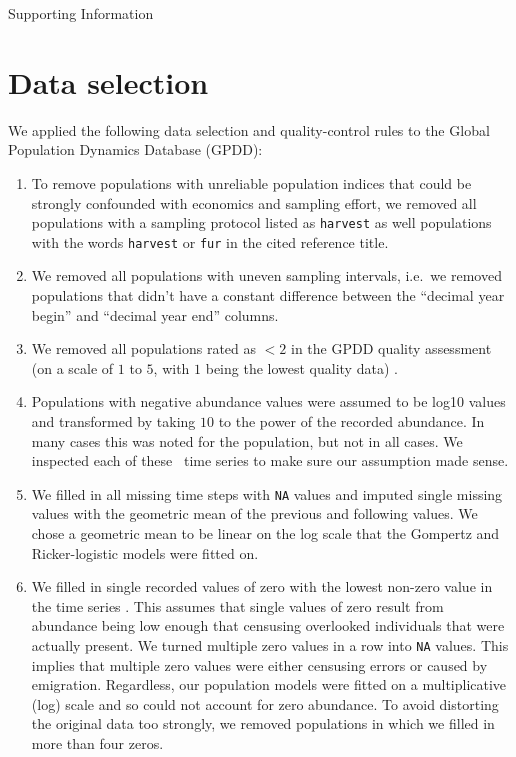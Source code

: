
\begin{centering}
\LARGE
Supporting Information\\[1.0em]
\end{centering}

\section{Data selection}

We applied the following data selection and quality-control rules to the Global Population Dynamics Database (GPDD):

\begin{enumerate}

\item To remove populations with unreliable population indices that could be strongly confounded with economics and sampling effort, we removed all populations with a sampling protocol listed as \texttt{harvest} as well populations with the words \texttt{harvest} or \texttt{fur} in the cited reference title.

\item We removed all populations with uneven sampling intervals, i.e.\ we removed populations that didn't have a constant difference between the ``decimal year begin'' and ``decimal year end'' columns.

\item We removed all populations rated as $< 2$ in the GPDD quality assessment (on a scale of $1$ to $5$, with $1$ being the lowest quality data) \citep[following][]{sibly2005, ziebarth2010}.

\item Populations with negative abundance values were assumed to be log10 values and transformed by taking $10$ to the power of the recorded abundance. In many cases this was noted for the population, but not in all cases. We inspected each of these \totalAssumedLog~time series to make sure our assumption made sense.

\item We filled in all missing time steps with \texttt{NA} values and imputed single missing values with the geometric mean of the previous and following values. We chose a geometric mean to be linear on the log scale that the Gompertz and Ricker-logistic models were fitted on.

\item We filled in single recorded values of zero with the lowest non-zero value in the time series \citep[following][]{brook2006a}. This assumes that single values of zero result from abundance being low enough that censusing overlooked individuals that were actually present. We turned multiple zero values in a row into \texttt{NA} values. This implies that multiple zero values were either censusing errors or caused by emigration. Regardless, our population models were fitted on a multiplicative (log) scale and so could not account for zero abundance. To avoid distorting the original data too strongly, we removed populations in which we filled in more than four zeros.


\end{enumerate}
